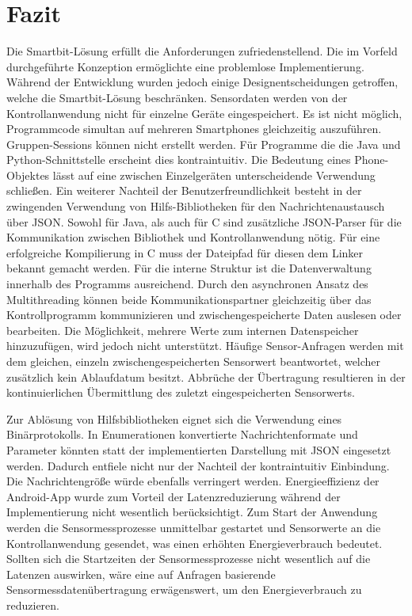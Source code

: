 \documentclass[11pt,a4paper]{report}
\begin{document}
\chapter{Fazit}\label{chap:fazit}
Die Smartbit-Lösung erfüllt die Anforderungen zufriedenstellend.
Die im Vorfeld durchgeführte Konzeption ermöglichte eine problemlose Implementierung.
Während der Entwicklung wurden jedoch einige Designentscheidungen getroffen, welche die Smartbit-Lösung beschränken.
Sensordaten werden von der Kontrollanwendung nicht für einzelne Geräte eingespeichert.
Es ist nicht möglich, Programmcode simultan auf mehreren Smartphones gleichzeitig auszuführen.
Gruppen-Sessions können nicht erstellt werden.
Für Programme die die Java und Python-Schnittstelle erscheint dies kontraintuitiv.
Die Bedeutung eines Phone-Objektes lässt auf eine zwischen Einzelgeräten unterscheidende Verwendung schließen.
Ein weiterer Nachteil der Benutzerfreundlichkeit besteht in der zwingenden Verwendung von Hilfs-Bibliotheken für den Nachrichtenaustausch über JSON.
Sowohl für Java, als auch für C sind zusätzliche JSON-Parser für die Kommunikation zwischen Bibliothek und Kontrollanwendung nötig.
Für eine erfolgreiche Kompilierung in C muss der Dateipfad für diesen dem Linker bekannt gemacht werden.
Für die interne Struktur ist die Datenverwaltung innerhalb des Programms ausreichend.
Durch den asynchronen Ansatz des Multithreading können beide Kommunikationspartner gleichzeitig über das Kontrollprogramm kommunizieren und zwischengespeicherte Daten auslesen oder bearbeiten.
Die Möglichkeit, mehrere Werte zum internen Datenspeicher hinzuzufügen, wird jedoch nicht unterstützt.
Häufige Sensor-Anfragen werden mit dem gleichen, einzeln zwischengespeicherten Sensorwert beantwortet, welcher zusätzlich kein Ablaufdatum besitzt.
Abbrüche der Übertragung resultieren in der kontinuierlichen Übermittlung des zuletzt eingespeicherten Sensorwerts.

Zur Ablösung von Hilfsbibliotheken eignet sich die Verwendung eines Binärprotokolls.
In Enumerationen konvertierte Nachrichtenformate und Parameter könnten statt der implementierten Darstellung mit JSON eingesetzt werden.
Dadurch entfiele nicht nur der Nachteil der kontraintuitiv Einbindung.
Die Nachrichtengröße würde ebenfalls verringert werden.
Energieeffizienz der Android-App wurde zum Vorteil der Latenzreduzierung während der Implementierung nicht wesentlich berücksichtigt.
Zum Start der Anwendung werden die Sensormessprozesse unmittelbar gestartet und Sensorwerte an die Kontrollanwendung gesendet, was einen erhöhten Energieverbrauch bedeutet.
Sollten sich die Startzeiten der Sensormessprozesse nicht wesentlich auf die Latenzen auswirken, wäre eine auf Anfragen basierende Sensormessdatenübertragung erwägenswert, um den Energieverbrauch zu reduzieren.
\end{document}
